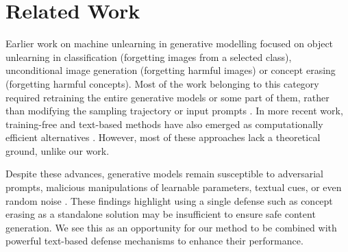 \section{Related Work}
%
%
%
%
%

Earlier work on machine unlearning in generative modelling focused on object unlearning in classification (forgetting images from a selected class), unconditional image generation (forgetting harmful images) or concept erasing (forgetting harmful concepts). Most of the work belonging to this category required retraining the entire generative models or some part of them, rather than modifying the sampling trajectory or input prompts \cite{heng2023selective, li2024machine, adapt_then_unlearn, zhang2024forgetmenot, gandikota2023unified, lu2024mace, gong2024reliable, lu2024mace}. 
In more recent work, training-free and text-based methods have also emerged as computationally efficient alternatives \cite{schramowski2023safe,yoon2024safree,ban2024understanding, armandpour2023reimagine}. 
However, most of these approaches lack a theoretical ground, unlike our work. 


%
%

%

%

%
%

%

%

%
%
%
%

 





%


Despite these advances, generative models remain susceptible to adversarial prompts, malicious manipulations of learnable parameters, textual cues, or even random noise \cite{pham2023circumventing, chin2024promptingdebugging, zhang2024generate, tsai2024ringabell}. These findings highlight using a single defense such as concept erasing as a standalone solution may be insufficient to ensure safe content generation. We see this as an opportunity for our method to be combined with powerful text-based defense mechanisms to enhance their performance.  



%


